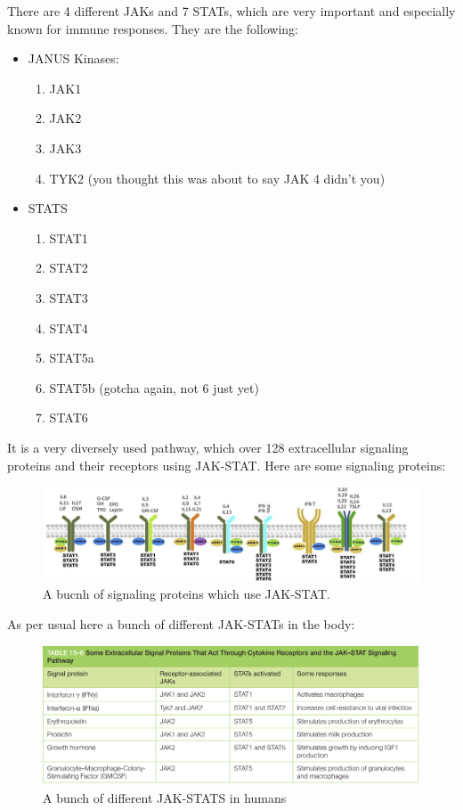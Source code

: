 \documentclass[../main.tex]{subfiles}
\begin{document}
There are 4 different JAKs and 7 STATs, which are very important and especially known for immune responses. They are the following:
\begin{itemize}
	\item JANUS Kinases:
	\begin{enumerate}
		\item JAK1
		\item JAK2
		\item JAK3
		\item TYK2 (you thought this was about to say JAK 4 didn't you)
	\end{enumerate}
	\item STATS
	\begin{enumerate}
		\item STAT1
		\item STAT2
		\item STAT3
		\item STAT4
		\item STAT5a
		\item STAT5b (gotcha again, not 6 just yet)
		\item STAT6
	\end{enumerate}
\end{itemize}

It is a very diversely used pathway, which over 128 extracellular signaling proteins and their receptors using JAK-STAT. Here are some signaling proteins:

\begin{figure}[H]
	\centering
	\includegraphics[width=0.7\linewidth]{Jak_sig}
	\caption{A bucnh of signaling proteins which use JAK-STAT.}
\end{figure}


As per usual here a bunch of different JAK-STATs in the body:
\begin{figure}[H]
	\centering
	\includegraphics[width=0.7\linewidth]{Jak_ex}
	\caption{A bunch of different JAK-STATS in humans}
\end{figure}
\end{document}
